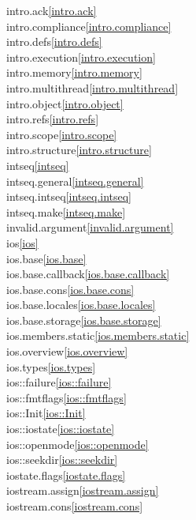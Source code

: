 \begin{multicols}{2}
intro.ack\quad\ref{intro.ack}\\
intro.compliance\quad\ref{intro.compliance}\\
intro.defs\quad\ref{intro.defs}\\
intro.execution\quad\ref{intro.execution}\\
intro.memory\quad\ref{intro.memory}\\
intro.multithread\quad\ref{intro.multithread}\\
intro.object\quad\ref{intro.object}\\
intro.refs\quad\ref{intro.refs}\\
intro.scope\quad\ref{intro.scope}\\
intro.structure\quad\ref{intro.structure}\\
intseq\quad\ref{intseq}\\
intseq.general\quad\ref{intseq.general}\\
intseq.intseq\quad\ref{intseq.intseq}\\
intseq.make\quad\ref{intseq.make}\\
invalid.argument\quad\ref{invalid.argument}\\
ios\quad\ref{ios}\\
ios.base\quad\ref{ios.base}\\
ios.base.callback\quad\ref{ios.base.callback}\\
ios.base.cons\quad\ref{ios.base.cons}\\
ios.base.locales\quad\ref{ios.base.locales}\\
ios.base.storage\quad\ref{ios.base.storage}\\
ios.members.static\quad\ref{ios.members.static}\\
ios.overview\quad\ref{ios.overview}\\
ios.types\quad\ref{ios.types}\\
ios::failure\quad\ref{ios::failure}\\
ios::fmtflags\quad\ref{ios::fmtflags}\\
ios::Init\quad\ref{ios::Init}\\
ios::iostate\quad\ref{ios::iostate}\\
ios::openmode\quad\ref{ios::openmode}\\
ios::seekdir\quad\ref{ios::seekdir}\\
iostate.flags\quad\ref{iostate.flags}\\
iostream.assign\quad\ref{iostream.assign}\\
iostream.cons\quad\ref{iostream.cons}\\

\end{multicols}
